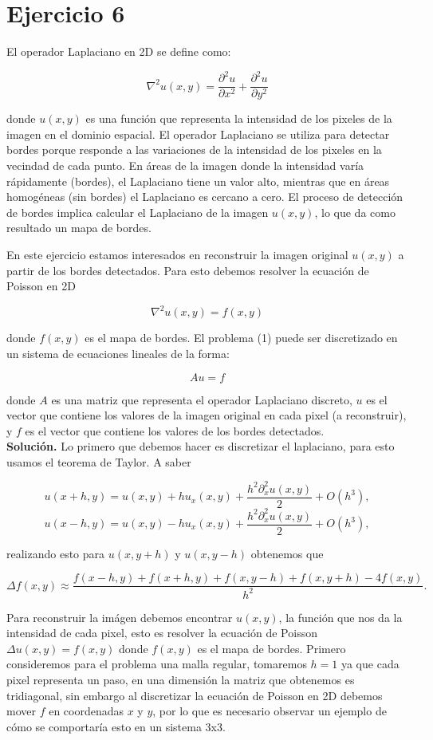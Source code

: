 
\section*{Ejercicio 6}
El operador Laplaciano en 2D se define como:

$$
\nabla^2 u(x, y)=\frac{\partial^2 u}{\partial x^2}+\frac{\partial^2 u}{\partial y^2}
$$

donde $u(x, y)$ es una función que representa la intensidad de los pixeles de la imagen en el dominio espacial. El operador Laplaciano se utiliza para detectar bordes porque responde a las variaciones de la intensidad de los pixeles en la vecindad de cada punto. En áreas de la imagen donde la intensidad varía rápidamente (bordes), el Laplaciano tiene un valor alto, mientras que en áreas homogéneas (sin bordes) el Laplaciano es cercano a cero. El proceso de detección de bordes implica calcular el Laplaciano de la imagen $u(x, y)$, lo que da como resultado un mapa de bordes.

En este ejercicio estamos interesados en reconstruir la imagen original $u(x, y)$ a partir de los bordes detectados. Para esto debemos resolver la ecuación de Poisson en 2D

$$
\nabla^2 u(x, y)=f(x, y)
$$

donde $f(x, y)$ es el mapa de bordes.
El problema (1) puede ser discretizado en un sistema de ecuaciones lineales de la forma:

$$
A u=f
$$

donde $A$ es una matriz que representa el operador Laplaciano discreto, $u$ es el vector que contiene los valores de la imagen original en cada pixel (a reconstruir), y $f$ es el vector que contiene los valores de los bordes detectados.\\

\textbf{Solución.} Lo primero que debemos hacer es  discretizar el laplaciano,  para esto usamos el teorema de Taylor. A saber

    $$u(x+h,y)=u(x,y)+h u_x(x,y)+\frac{h^2\partial^2_{x}u(x,y)}{2}+O(h^3),$$
    $$u(x-h,y)=u(x,y)-h u_x(x,y)+\frac{h^2\partial^2_x u(x,y)}{2}+O(h^3),$$

    realizando esto para $u(x,y+h)$ y $u(x,y-h)$ obtenemos que

    $$\Delta f(x, y) \approx \frac{f(x-h, y)+f(x+h, y)+f(x, y-h)+f(x, y+h)-4 f(x, y)}{h^2}.$$

    Para reconstruir la imágen debemos encontrar $u(x,y)$, la función que nos da la intensidad de cada pixel, esto es resolver la ecuación de  Poisson $\Delta u(x,y)= f(x,y)$ donde $f(x,y)$ es el mapa de bordes. Primero consideremos para el problema una malla regular, tomaremos $h=1$ ya que cada pixel representa un paso, en una  dimensión la matriz que obtenemos es tridiagonal, sin embargo al discretizar la ecuación de Poisson en 2D debemos mover $f$ en coordenadas $x$ y $y$, por lo que es necesario observar un ejemplo de cómo se comportaría esto en un sistema 3x3.\\


